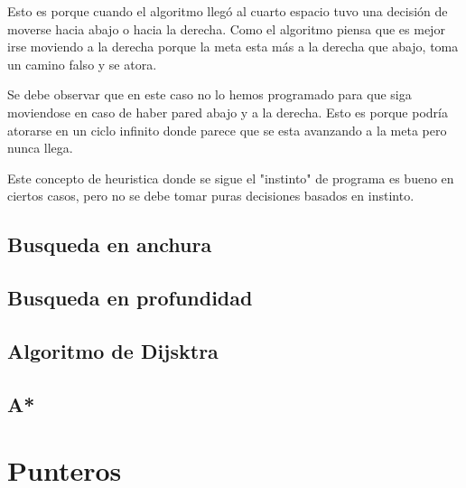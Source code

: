 \documentclass{article}
\begin{document}
Esto es porque cuando el algoritmo llegó al cuarto espacio tuvo una decisión de moverse hacia abajo o hacia la derecha. Como el algoritmo piensa que es mejor irse moviendo a la derecha porque la meta esta más a la derecha que abajo, toma un camino falso y se atora.

Se debe observar que en este caso no lo hemos programado para que siga moviendose en caso de haber pared abajo y a la derecha. Esto es porque podría atorarse en un ciclo infinito donde parece que se esta avanzando a la meta pero nunca llega.

Este concepto de heuristica donde se sigue el "instinto" de programa es bueno en ciertos casos, pero no se debe tomar puras decisiones basados en instinto.

\subsection{Busqueda en anchura}

\subsection{Busqueda en profundidad}

\subsection{Algoritmo de Dijsktra}

\subsection{A*}

\section{Punteros}
\end{document}
